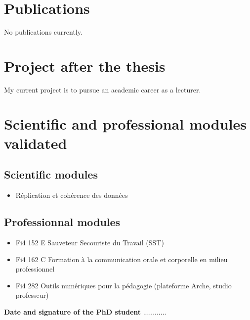 \documentclass[11pt]{article}
\begin{document}
\section*{Publications}
\hspace{1em} No publications currently.

\section*{Project after the thesis}
\hspace{1em} My current project is to pursue an academic career as a lecturer.

\section*{Scientific and professional modules validated}

\subsection*{Scientific modules}

\begin{itemize}
    \item Réplication et cohérence des données
\end{itemize}

\subsection*{Professionnal modules}

\begin{itemize}
    \item Fi4 152 E Sauveteur Secouriste du Travail (SST)
    \item Fi4 162 C Formation à la communication orale et corporelle en milieu professionnel
    \item Fi4 282 Outils numériques pour la pédagogie (plateforme Arche, studio professeur)
\end{itemize}

\bigskip
\bigskip
\noindent\textbf{Date and signature of the PhD student}
............

\newpage
\end{document}
